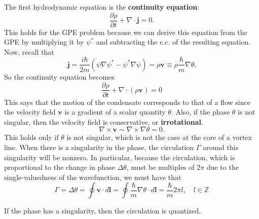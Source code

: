 \documentclass{book}
\theoremstyle{definition}
\newcommand{\p}{\partial}
\newcommand{\f}[2]{\frac{#1}{#2}}
\newcommand{\lp}{\left(}
\newcommand{\rp}{\right)}
\begin{document}
The first hydrodynamic equation is the \textbf{continuity equation}: 
\begin{equation*}
\f{\p \rho}{\p t} + \nabla \cdot \mathbf{j} = 0.
\end{equation*}
This holds for the GPE problem because we can derive this equation from the GPE by multiplying it by $\psi^*$ and subtracting the c.c. of the resulting equation. Now, recall that 
\begin{equation*}
\mathbf{j} = \f{i\hbar}{2m}\lp \psi \nabla \psi^* - \psi^* \nabla \psi \rp = \rho \mathbf{v} \equiv \rho\f{\hbar}{m}\nabla \theta.
\end{equation*}
So the continuity equation becomes
\begin{equation*}
\boxed{\f{\p \rho}{\p t}  + \nabla \cdot (\rho \mathbf{v}) = 0}
\end{equation*}
This says that the motion of the condensate corresponds to that of a flow since the velocity field $\mathbf{v}$ is a gradient of a scalar quantity $\theta$. Also, if the phase $\theta$ is not singular, then the velocity field is conservative, or \textbf{irrotational}.
\begin{equation*}
\nabla \times \mathbf{v} \sim \nabla \times \nabla \theta = 0.
\end{equation*} 
This holds only if $\theta$ is not singular, which is not the case at the core of a vortex line. When there is a singularity in the phase, the circulation $\Gamma$ around this singularity will be nonzero. In particular, because the circulation, which is proportional to the change in phase $\Delta \theta$, must be multiples of $2\pi$ due to the single-valuedness of the wavefunction, we must have that
\begin{equation*}
\boxed{\Gamma = \Delta \theta = \oint \mathbf{v}\cdot d\mathbf{l} = \oint \f{\hbar}{m}\nabla \theta \cdot d\mathbf{l} = \f{\hbar}{m}2\pi l, \quad l\in \mathbb{Z}}
\end{equation*}
\begin{framed}
If the phase has a singularity, then the circulation is quantized.
\end{framed}
\end{document}
